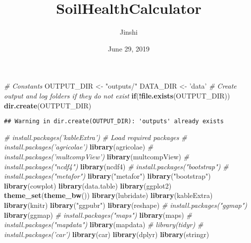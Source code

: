 \documentclass[]{article}
\title{SoilHealthCalculator}
\author{Jinshi}
\date{June 29, 2019}
\newenvironment{Shaded}{\begin{snugshade}}{\end{snugshade}}
\newcommand{\CommentTok}[1]{\textcolor[rgb]{0.56,0.35,0.01}{\textit{#1}}}
\newcommand{\ControlFlowTok}[1]{\textcolor[rgb]{0.13,0.29,0.53}{\textbf{#1}}}
\newcommand{\KeywordTok}[1]{\textcolor[rgb]{0.13,0.29,0.53}{\textbf{#1}}}
\newcommand{\NormalTok}[1]{#1}
\newcommand{\OperatorTok}[1]{\textcolor[rgb]{0.81,0.36,0.00}{\textbf{#1}}}
\newcommand{\StringTok}[1]{\textcolor[rgb]{0.31,0.60,0.02}{#1}}
\begin{document}
\maketitle

\begin{Shaded}
\begin{Highlighting}[]
\CommentTok{# Constants}
\NormalTok{OUTPUT_DIR      <-}\StringTok{ "outputs/"}
\NormalTok{DATA_DIR <-}\StringTok{ 'data'}
\CommentTok{# Create output and log folders if they do not exist}
\ControlFlowTok{if}\NormalTok{(}\OperatorTok{!}\KeywordTok{file.exists}\NormalTok{(OUTPUT_DIR)) }\KeywordTok{dir.create}\NormalTok{(OUTPUT_DIR)}
\end{Highlighting}
\end{Shaded}

\begin{verbatim}
## Warning in dir.create(OUTPUT_DIR): 'outputs' already exists
\end{verbatim}

\begin{Shaded}
\begin{Highlighting}[]
\CommentTok{# install.packages('kableExtra')}
\CommentTok{# Load required packages}
\CommentTok{# install.packages('agricolae')}
\KeywordTok{library}\NormalTok{(agricolae)}
\CommentTok{# install.packages('multcompView')}
\KeywordTok{library}\NormalTok{(multcompView)}
\CommentTok{# install.packages("ncdf4")}
\KeywordTok{library}\NormalTok{(ncdf4)}
\CommentTok{# install.packages("bootstrap")}
\CommentTok{# install.packages("metafor")}
\KeywordTok{library}\NormalTok{(}\StringTok{"metafor"}\NormalTok{)}
\KeywordTok{library}\NormalTok{(}\StringTok{"bootstrap"}\NormalTok{)}
\KeywordTok{library}\NormalTok{(cowplot)}
\KeywordTok{library}\NormalTok{(data.table)}
\KeywordTok{library}\NormalTok{(ggplot2)}
\KeywordTok{theme_set}\NormalTok{(}\KeywordTok{theme_bw}\NormalTok{())}
\KeywordTok{library}\NormalTok{(lubridate)}
\KeywordTok{library}\NormalTok{(kableExtra)}
\KeywordTok{library}\NormalTok{(knitr)}
\KeywordTok{library}\NormalTok{(}\StringTok{"ggpubr"}\NormalTok{)}
\KeywordTok{library}\NormalTok{(reshape)}
\CommentTok{# install.packages("ggmap")}
\KeywordTok{library}\NormalTok{(ggmap)}
\CommentTok{# install.packages("maps")}
\KeywordTok{library}\NormalTok{(maps)}
\CommentTok{# install.packages("mapdata")}
\KeywordTok{library}\NormalTok{(mapdata)}
\CommentTok{# library(tidyr)}
\CommentTok{# install.packages('car')}
\KeywordTok{library}\NormalTok{(car)}
\KeywordTok{library}\NormalTok{(dplyr)}
\KeywordTok{library}\NormalTok{(stringr)}
\end{Highlighting}
\end{Shaded}
\end{document}
